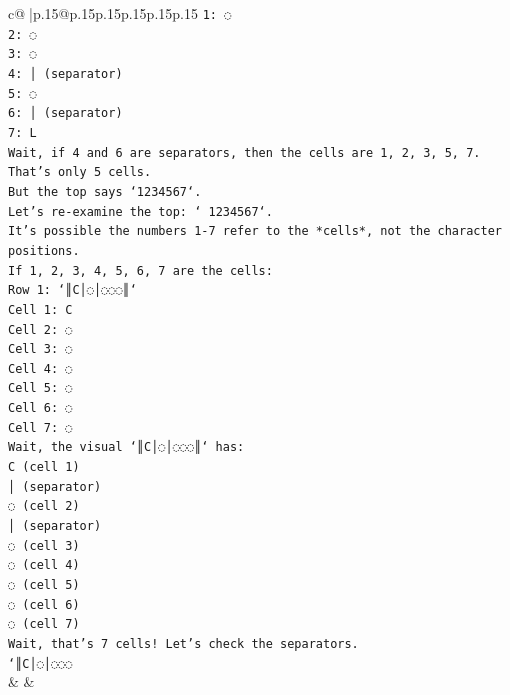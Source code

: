 \documentclass{article}
\begin{document}
{\begin{supertabular}{c@{$\;$}|p{.15\linewidth}@{}p{.15\linewidth}p{.15\linewidth}p{.15\linewidth}p{.15\linewidth}p{.15\linewidth}}
{{{\texttt{1: ◌} \\
\texttt{2: ◌} \\
\texttt{3: ◌} \\
\texttt{4: │ (separator)} \\
\texttt{5: ◌} \\
\texttt{6: │ (separator)} \\
\texttt{7: L} \\
\texttt{Wait, if 4 and 6 are separators, then the cells are 1, 2, 3, 5, 7. That's only 5 cells.} \\
\texttt{But the top says `1234567`.} \\
\texttt{Let's re{-}examine the top: ` 1234567`.} \\
\texttt{It's possible the numbers 1{-}7 refer to the *cells*, not the character positions.} \\
\texttt{If 1, 2, 3, 4, 5, 6, 7 are the cells:} \\
\texttt{Row 1: `║C│◌│◌◌◌║`} \\
\texttt{Cell 1: C} \\
\texttt{Cell 2: ◌} \\
\texttt{Cell 3: ◌} \\
\texttt{Cell 4: ◌} \\
\texttt{Cell 5: ◌} \\
\texttt{Cell 6: ◌} \\
\texttt{Cell 7: ◌} \\
\texttt{Wait, the visual `║C│◌│◌◌◌║` has:} \\
\texttt{C (cell 1)} \\
\texttt{│ (separator)} \\
\texttt{◌ (cell 2)} \\
\texttt{│ (separator)} \\
\texttt{◌ (cell 3)} \\
\texttt{◌ (cell 4)} \\
\texttt{◌ (cell 5)} \\
\texttt{◌ (cell 6)} \\
\texttt{◌ (cell 7)} \\
\texttt{Wait, that's 7 cells! Let's check the separators.} \\
\texttt{`║C│◌│◌◌◌} \\
            }
        }
    }
    & & \\ \\


\end{supertabular}}
\end{document}
